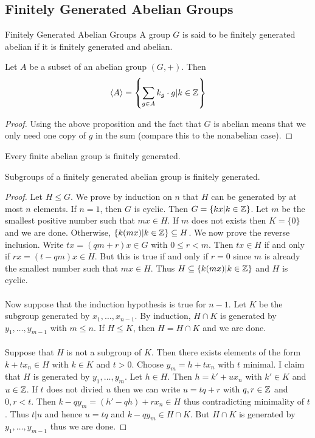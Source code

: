 \documentclass[a4paper]{article}
\begin{document}
\subsection{Finitely Generated Abelian Groups}
\begin{defn}{Finitely Generated Abelian Groups}{} A group $G$ is said to be finitely generated abelian if it is finitely generated and abelian. 
\end{defn}

\begin{lmm}{}{} Let $A$ be a subset of an abelian group $(G,+)$. Then $$\langle A\rangle=\left\{\sum_{g\in A}k_g\cdot g|k\in\mathbb{Z}\right\}$$\tcbline
\begin{proof}
Using the above proposition and the fact that $G$ is abelian means that we only need one copy of $g$ in the sum (compare this to the nonabelian case). 
\end{proof}
\end{lmm}

\begin{lmm}{}{} Every finite abelian group is finitely generated. 
\end{lmm}

\begin{prp}{}{} Subgroups of a finitely generated abelian group is finitely generated. \tcbline
\begin{proof}
Let $H\leq G$. We prove by induction on $n$ that $H$ can be generated by at most $n$ elements. If $n=1$, then $G$ is cyclic. Then $G=\{kx|k\in\mathbb{Z}\}$. Let $m$ be the smallest positive number such that $mx\in H$. If $m$ does not exists then $K=\{0\}$ and we are done. Otherwise, $\{k(mx)|k\in\mathbb{Z}\}\subseteq H$. We now prove the reverse inclusion. Write $tx=(qm+r)x\in G$ with $0\leq r<m$. Then $tx\in H$ if and only if $rx=(t-qm)x\in H$. But this is true if and only if $r=0$ since $m$ is already the smallest number such that $mx\in H$. Thus $H\subseteq\{k(mx)|k\in\mathbb{Z}\}$ and $H$ is cyclic. \\~\\
Now suppose that the induction hypothesis is true for $n-1$.  Let $K$ be the subgroup generated by $x_1,\dots,x_{n-1}$. By induction, $H\cap K$ is generated by $y_1,\dots,y_{m-1}$ with $m\leq n$. If $H\leq K$, then $H=H\cap K$ and we are done. \\~\\
Suppose that $H$ is not a subgroup of $K$. Then there exists elements of the form $k+tx_n\in H$ with $k\in K$ and $t>0$. Choose $y_m=h+tx_n$ with $t$ minimal. I claim that $H$ is generated by $y_1,\dots,y_m$. Let $h\in H$. Then $h=k'+ux_n$ with $k'\in K$ and $u\in\mathbb{Z}$. If $t$ does not divied $u$ then we can write $u=tq+r$ with $q,r\in\mathbb{Z}$ and $0,r<t$. Then $k-qy_m=(h'-qh)+rx_n\in H$ thus contradicting minimality of $t$. Thus $t|u$ and hence $u=tq$ and $k-qy_m\in H\cap K$. But $H\cap K$ is generated by $y_1,\dots,y_{m-1}$ thus we are done. 
\end{proof}
\end{prp}
\end{document}
